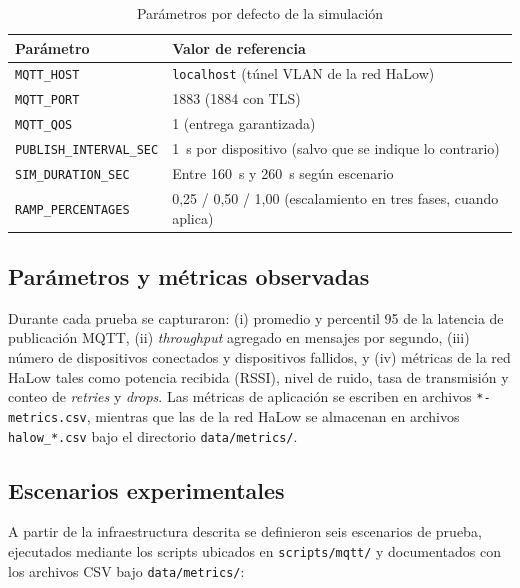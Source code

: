 \begin{table}[!t]
\centering
\caption{Par\'ametros por defecto de la simulaci\'on}
\label{tab:parametros-simulacion}
\begin{tabular}{@{}ll@{}}
\toprule
Par\'ametro & Valor de referencia \\
\midrule
\texttt{MQTT\_HOST} & \texttt{localhost} (t\'unel VLAN de la red HaLow) \\
\texttt{MQTT\_PORT} & 1883 (1884 con TLS) \\
\texttt{MQTT\_QOS} & 1 (entrega garantizada) \\
\texttt{PUBLISH\_INTERVAL\_SEC} & \SI{1}{\second} por dispositivo (salvo que se indique lo contrario) \\
\texttt{SIM\_DURATION\_SEC} & Entre \SI{160}{\second} y \SI{260}{\second} seg\'un escenario \\
\texttt{RAMP\_PERCENTAGES} & 0,25 / 0,50 / 1,00 (escalamiento en tres fases, cuando aplica) \\
\bottomrule
\end{tabular}
\end{table}

\subsection{Par\'ametros y m\'etricas observadas}
Durante cada prueba se capturaron: (i) promedio y percentil 95 de la latencia de publicaci\'on MQTT, (ii) \emph{throughput} agregado en mensajes por segundo, (iii) n\'umero de dispositivos conectados y dispositivos fallidos, y (iv) m\'etricas de la red HaLow tales como potencia recibida (RSSI), nivel de ruido, tasa de transmisi\'on y conteo de \emph{retries} y \emph{drops}. Las m\'etricas de aplicaci\'on se escriben en archivos \texttt{*-metrics.csv}, mientras que las de la red HaLow se almacenan en archivos \texttt{halow\_*.csv} bajo el directorio \texttt{data/metrics/}.

\subsection{Escenarios experimentales}
A partir de la infraestructura descrita se definieron seis escenarios de prueba, ejecutados mediante los scripts ubicados en \texttt{scripts/mqtt/} y documentados con los archivos CSV bajo \texttt{data/metrics/}:

